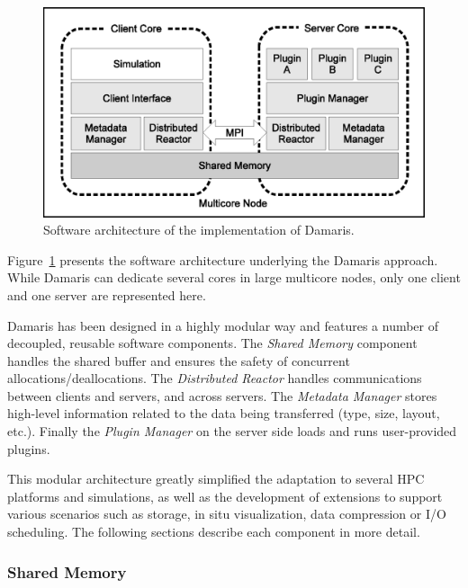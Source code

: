 \begin{figure}
	\begin{center}
	\includegraphics[width=\textwidth]{figures/damaris-schema.eps}
	\caption[Software architecture of the implementation of Damaris]{Software architecture of the implementation of Damaris.}\label{fig:damaris:design}
	\end{center}
\end{figure}

Figure~\ref{fig:damaris:design} presents the software architecture underlying the Damaris approach.
While Damaris can dedicate several cores in large multicore nodes, only one client
and one server are represented here.

Damaris has been designed in a highly modular way and features
a number of decoupled, reusable software components.
The \emph{Shared Memory} component handles the shared buffer and ensures the safety of
concurrent allocations/deallocations. The \emph{Distributed Reactor} handles communications between 
clients and servers, and across servers. The \emph{Metadata Manager} stores high-level information 
related to the data being transferred (type, size, layout, etc.).
Finally the \emph{Plugin Manager} on the server side loads and runs user-provided plugins.

This modular architecture greatly simplified the
adaptation to several HPC platforms and simulations, as well as the development of
extensions to support various scenarios such as storage, in situ visualization, data compression 
or I/O scheduling. The following sections describe each component in more detail.

\subsubsection{Shared Memory}

